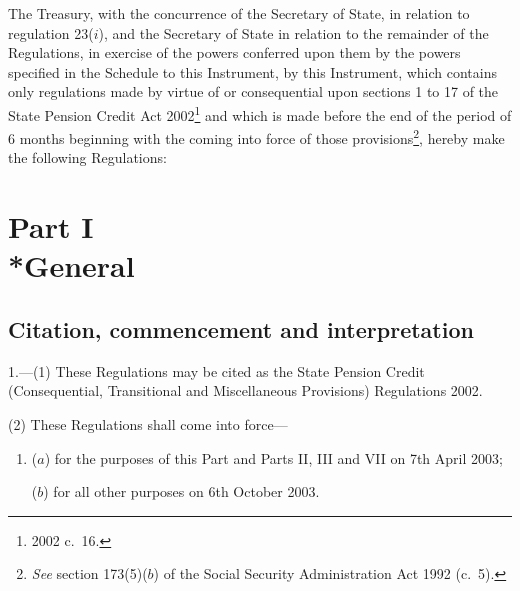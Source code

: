 \documentclass[12pt,a4paper]{article}
\title{\regstitle}
\author{S.I.\ 2002 No.\ 3019}
\date{Made
4th December 2002\\
Laid before Parliament
10th December 2002\\
Coming into force\\
for the purposes of Parts I, II, III and VII
7th April 2003\\
for all other purposes
6th October 2003
}
\begin{document}
\maketitle

\noindent
The Treasury, with the concurrence of the Secretary of State, in relation to regulation 23($i$), and the Secretary of State in relation to the remainder of the Regulations, in exercise of the powers conferred upon them by the powers specified in the Schedule to this Instrument, by this Instrument, which contains only regulations made by virtue of or consequential upon sections 1 to 17 of the State Pension Credit Act 2002\footnote{2002 c.\ 16.} and which is made before the end of the period of 6 months beginning with the coming into force of those provisions\footnote{\emph{See} section 173(5)($b$) of the Social Security Administration Act 1992 (c.\ 5).}, hereby make the following Regulations: 

{\sloppy

\tableofcontents

}

\bigskip

\setcounter{secnumdepth}{-2}

\section[Part I --- General]{Part I\\*General}

\subsection[1. Citation, commencement and interpretation]{Citation, commencement and interpretation}

\renewcommand\parthead{--- Part I}

1.---(1)  These Regulations may be cited as the State Pension Credit (Consequential, Transitional and Miscellaneous Provisions) Regulations 2002.

(2) These Regulations shall come into force—
\begin{enumerate}\item[]
($a$) for the purposes of this Part and Parts II, III and VII on 7th April 2003;

($b$) for all other purposes on 6th October 2003.
\end{enumerate}
\end{document}
